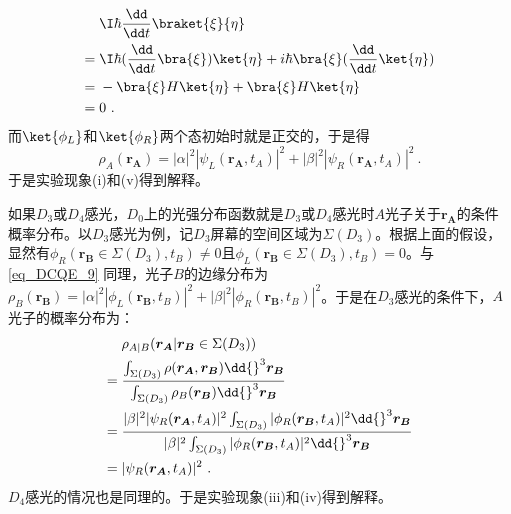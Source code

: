 \begin{align}
&\I\hbar\frac{\dd}{\dd t}\braket{\xi}{\eta} \notag \\
={}&\I\hbar(\frac{\dd}{\dd t}\bra{\xi})\ket{\eta}+i\hbar\bra{\xi}(\frac{\dd}{\dd t}\ket{\eta}) \notag \\
={}&-\bra{\xi}H\ket{\eta}+\bra{\xi}H\ket{\eta} \notag \\
={}&0~.
\end{align}
而$\ket{\phi_L}$和$\ket{\phi_R}$两个态初始时就是正交的，于是得
\begin{equation}\label{eq_DCQE_9}
\rho_A(\boldsymbol{r_A})=|\alpha|^2|\psi_L(\boldsymbol{r_A},t_A)|^2+|\beta|^2|\psi_R(\boldsymbol{r_A},t_A)|^2~.
\end{equation}
于是实验现象(i)和(v)得到解释。

如果$D_3$或$D_4$感光，$D_0$上的光强分布函数就是$D_3$或$D_4$感光时$A$光子关于$\boldsymbol{r_A}$的条件概率分布。以$D_3$感光为例，记$D_3$屏幕的空间区域为$\Sigma(D_3)$。根据上面的假设，显然有$\phi_R(\boldsymbol{r_B}\in\Sigma(D_3),t_B)\neq 0$且$\phi_L(\boldsymbol{r_B}\in\Sigma(D_3),t_B)=0$。与\autoref{eq_DCQE_9} 同理，光子$B$的边缘分布为$\rho_B(\boldsymbol{r_B})=|\alpha|^2|\phi_L(\boldsymbol{r_B},t_B)|^2+|\beta|^2|\phi_R(\boldsymbol{r_B},t_B)|^2$。于是在$D_3$感光的条件下，$A$光子的概率分布为：
\begin{align}
&\rho_{A|B}(\boldsymbol{r_A}|\boldsymbol{r_B}\in\Sigma(D_3)) \notag \\
={}&\frac{\int_{\Sigma(D_3)}\rho(\boldsymbol{r_A},\boldsymbol{r_B})\dd{}^3\boldsymbol{r_B}}{\int_{\Sigma(D_3)}\rho_B(\boldsymbol{r_B})\dd{}^3\boldsymbol{r_B}} \notag \\
={}&\frac{|\beta|^2|\psi_R(\boldsymbol{r_A},t_A)|^2\int_{\Sigma(D_3)}|\phi_R(\boldsymbol{r_B},t_A)|^2\dd{}^3\boldsymbol{r_B}}{|\beta|^2\int_{\Sigma(D_3)}|\phi_R(\boldsymbol{r_B},t_A)|^2\dd{}^3\boldsymbol{r_B}} \notag \\
={}&|\psi_R(\boldsymbol{r_A},t_A)|^2~.
\end{align}
$D_4$感光的情况也是同理的。于是实验现象(iii)和(iv)得到解释。


